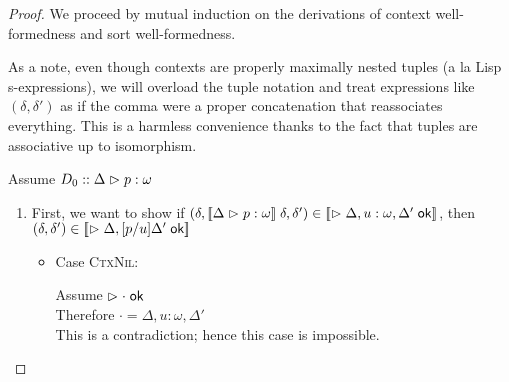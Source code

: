 \begin{proof}
  We proceed by mutual induction on the derivations of context
  well-formedness and sort well-formedness. 

  As a note, even though contexts are properly maximally nested tuples
  (a la Lisp s-expressions), we will overload the tuple notation and
  treat expressions like $(\delta, \delta')$ as if the comma were a
  proper concatenation that reassociates everything. This is a
  harmless convenience thanks to the fact that tuples are associative
  up to isomorphism.

  \noindent Assume $D_0 :: {\Delta} \vartriangleright {p} : {\omega}$ \\

  \begin{enumerate}
  \item First, we want to show if $(\delta, [\![{{\Delta} \vartriangleright {p} : {\omega}}]\!]\;\delta, \delta') \in 
                                   [\![{\vartriangleright {\Delta, u:\omega, \Delta'} \;\mathsf{ok}}]\!]$, 
      then $(\delta, \delta') \in [\![{\vartriangleright {\Delta, [p/u]\Delta'} \;\mathsf{ok}}]\!]$
      
      \begin{itemize}
      \item Case \textsc{CtxNil}:
        \begin{tabbedproof}
          \oo Assume $\vartriangleright {\cdot} \;\mathsf{ok}$ \\
          \ooo Therefore $\cdot = \Delta, u:\omega, \Delta'$ \\
          \ooo This is a contradiction; hence this case is impossible. \\
        \end{tabbedproof}


\end{itemize}
\end{enumerate}
\end{proof}
